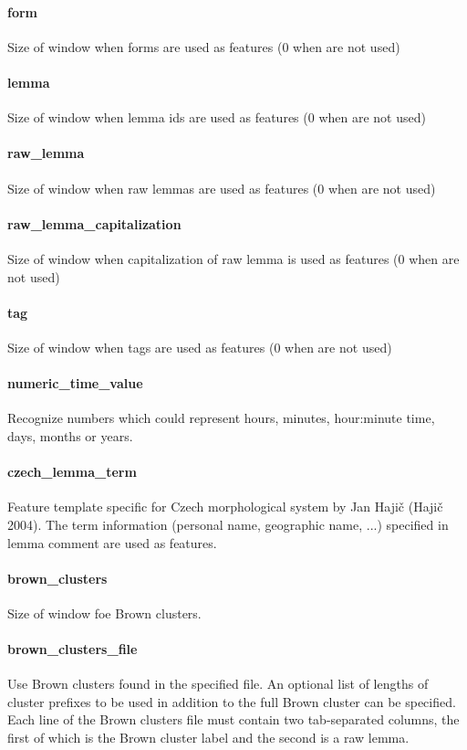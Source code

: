 \documentclass[12pt,a4paper]{report}
\begin{document}
\paragraph{form}
Size of window when forms are used as features (0 when are not used)

\paragraph{lemma}
Size of window when lemma ids are used as features (0 when are not used)

\paragraph{raw\_lemma}
Size of window when raw lemmas are used as features (0 when are not used)

\paragraph{raw\_lemma\_capitalization}
Size of window when capitalization of raw lemma is used as features (0 when are not used)

\paragraph{tag}
Size of window when tags are used as features (0 when are not used)

\paragraph{numeric\_time\_value}
Recognize numbers which could represent hours, minutes, hour:minute time, days,
months or years.

\paragraph{czech\_lemma\_term}
Feature template specific for Czech morphological system by Jan Hajič (Hajič 2004).
The term information (personal name, geographic name, ...) specified in lemma comment
are used as features.

\paragraph{brown\_clusters}
Size of window foe Brown clusters.

\paragraph{brown\_clusters\_file}
Use Brown clusters found in the specified file. An optional list of lengths of
cluster prefixes to be used in addition to the full Brown cluster can be specified.
Each line of the Brown clusters file must contain two tab-separated columns,
the first of which is the Brown cluster label and the second is a raw lemma.
\end{document}
